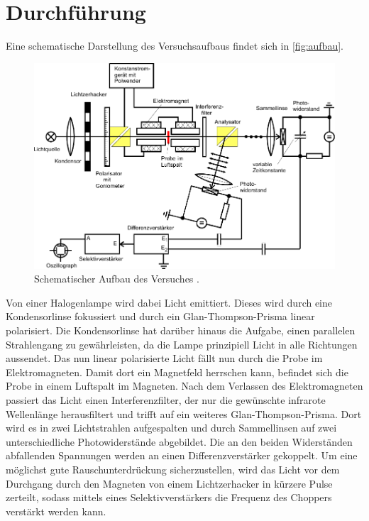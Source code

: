 \section{Durchführung}
\label{sec:durchführung}

Eine schematische Darstellung des Versuchsaufbaus findet sich in \autoref{fig:aufbau}.

\begin{figure}[H]
    \centering
    \includegraphics{figures/Aufbau.pdf}
    \caption{Schematischer Aufbau des Versuches \cite{v46}.}
    \label{fig:aufbau}
\end{figure}

Von einer Halogenlampe wird dabei Licht emittiert. Dieses wird durch eine Kondensorlinse fokussiert und durch ein Glan-Thompson-Prisma linear polarisiert.
Die Kondensorlinse hat darüber hinaus die Aufgabe, einen parallelen Strahlengang zu gewährleisten, da die Lampe prinzipiell Licht in alle Richtungen aussendet.
Das nun linear polarisierte Licht fällt nun durch die Probe im Elektromagneten.
Damit dort ein Magnetfeld herrschen kann, befindet sich die Probe in einem Luftspalt im Magneten.
Nach dem Verlassen des Elektromagneten passiert das Licht einen Interferenzfilter, der nur die gewünschte infrarote Wellenlänge herausfiltert und
trifft auf ein weiteres Glan-Thompson-Prisma.
Dort wird es in zwei Lichtstrahlen aufgespalten und durch Sammellinsen auf zwei unterschiedliche Photowiderstände abgebildet.
Die an den beiden Widerständen abfallenden Spannungen werden an einen Differenzverstärker gekoppelt.
Um eine möglichst gute Rauschunterdrückung sicherzustellen, wird das Licht vor dem Durchgang durch den Magneten von einem Lichtzerhacker in kürzere Pulse zerteilt,
sodass mittels eines Selektivverstärkers die Frequenz des Choppers verstärkt werden kann.

